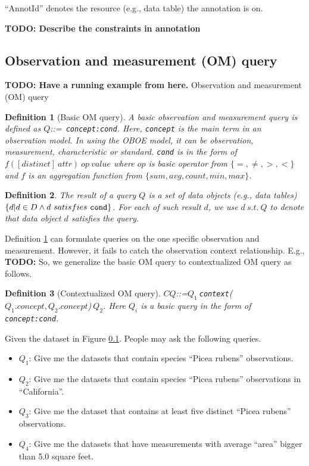 \documentclass[conference]{IEEEtran}
\newtheorem{definition}{Definition}[section]
\begin{document}
``AnnotId'' denotes the resource (e.g., data table) the annotation is on.

{\bf TODO: Describe the constraints in annotation}

\subsection{Observation and measurement (OM) query}

{\bf TODO: Have a running example from here.}
Observation and measurement (OM) query

\begin{definition}[Basic OM query]\label{def:basic_omq}
A basic observation and measurement query is defined as $Q$::={\tt
  concept:cond}. 
Here, {\tt concept} is the main term in an observation model. 
In using the OBOE model, it can be observation, measurement,
characteristic or standard. 
{\tt cond} is in the form of $f([distinct]~attr)~op~value$ where $op$ is
basic operator from $\{=, \neq, >, <\}$ and $f$ is an
aggregation function from $\{sum, avg, count, min, max\}$. 
\end{definition}

\begin{definition}\label{def:qresult}
The result of a query $Q$ is a set of data objects (e.g., data tables) 
$\{d|d\in D \wedge d~satisfies~{\tt cond}\}$. 
For each of such result $d$, we use $d~s.t.~Q$ to denote that
data object $d$ satisfies the query. 
\end{definition}
 
Definition \ref{def:basic_omq} can formulate queries on the
one specific observation and measurement. 
However, it fails to catch the observation context relationship. 
E.g., {\bf TODO: }
So, we generalize the basic OM query to contextualized OM query as
follows. 

\begin{definition}[Contextualized OM query]\label{def:context_omq}
$CQ$::=$Q_1~${\tt context}($Q_1.concept, Q_2.concept$)$~Q_2$. Here $Q_i$ is a basic query
in the form of {\tt concept:cond}. 
\end{definition}

Given the dataset in Figure \ref{}. 
People may ask the following queries. 

\begin{itemize}
\item $Q_1$: Give me the datasets that contain species ``Picea rubens'' observations.
\item $Q_2$: Give me the datasets that contain species ``Picea rubens''
  observations in ``California''. 
\item $Q_3$: Give me the dataset that contains at least five distinct ``Picea rubens'' observations.
\item $Q_4$: Give me the datasets that have measurements with average ``area''
bigger than 5.0 square feet. 
\end{itemize}
\end{document}
